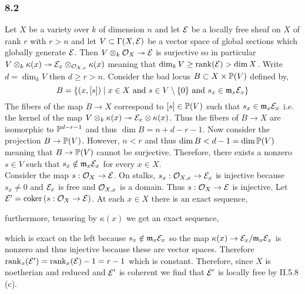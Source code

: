 \documentclass[12pt]{article}
\begin{document}
\subsubsection{8.2}

Let $X$ be a variety over $k$ of dimension $n$ and let $\E$ be a locally free sheaf on $X$ of rank $r$ with $r > n$ and let $V \subset \Gamma(X, \E)$ be a vector space of global sections which globally generate $\E$. Then $V \otimes_k \struct{X} \onto \E$ is surjective so in particular $V \otimes_k \kappa(x) \onto \E_x \otimes_{\stalk{X}{x}} \kappa(x)$ meaning that $\dim_k{V} \ge \rank{(\E)} > \dim{X}$. Write $d = \dim_k{V}$ then $d \ge r > n$. 
Consider the bad locus $B \subset X \times \P(V)$ defined by,
\[ B = \{ (x, [s]) \mid x \in X \text{ and } s \in V \setminus \{ 0 \} \text{ and } s_x \in \m_x \E_x \} \]
The fibers of the map $B \to X$ correspond to $[s] \in \P(V)$ such that $s_x \in \m_x \E_x$ i.e. the kernel of the map $V \otimes_k \kappa(x) \onto \E_x \otimes \kappa(x)$. Thus the fibers of $B \to X$ are isomorphic to $\P^{d - r - 1}$ and thus $\dim{B} = n + d - r - 1$. Now consider the projection $B \to \P(V)$. However,  $n < r$ and thus $\dim{B} < d - 1 = \dim{\P(V)}$ meaning that $B \to \P(V)$ cannot be surjective. Therefore, there exists a nonzero $s \in V$ such that $s_x \notin \m_x \E_x$ for every $x \in X$.
\bigskip\\
Consider the map $s : \struct{X} \to \E$. On stalks, $s_x : \stalk{X}{x} \to \E_x$ is injective because $s_x \neq 0$ and $\E_x$ is free and $\stalk{X}{x}$ is a domain. Thus $s : \struct{X} \to \E$ is injective. Let $\E' = \coker{(s : \struct{X} \to \E)}$. At each $x \in X$ there is an exact sequence,
\begin{center}
\end{center}
furthermore, tensoring by $\kappa(x)$ we get an exact sequence,
\begin{center}
\end{center}
which is exact on the left because $s_x \notin \m_x \E_x$ so the map $\kappa(x) \to \E_x / \m_x \E_x$ is nonzero and thus injective because these are vector spaces. Therefore $\rank_x(\E') = \rank_x(\E) - 1 = r - 1$ which is constant. Therefore, since $X$ is noetherian and reduced and $\E'$ is coherent we find that $\E'$ is locally free by II.5.8 (c).
\end{document}
